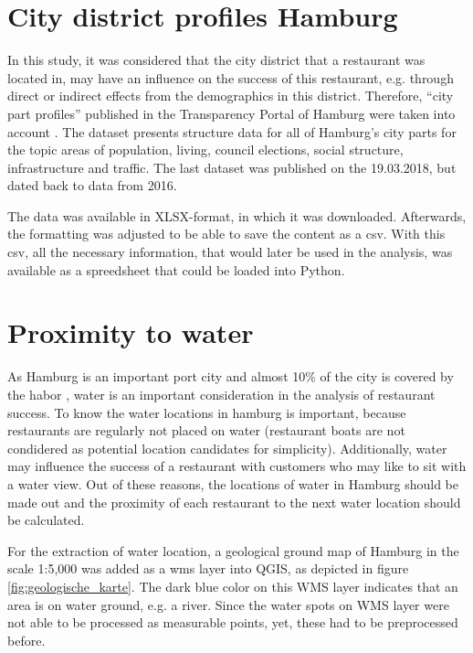 \documentclass[a4paper, 11pt, oneside]{Thesis}  %
\begin{document}
\section{City district profiles Hamburg}
\label{district_profiles}

In this study, it was considered that the city district that a restaurant was located in, may have an influence on the success of this restaurant, e.g. through direct or indirect effects from the demographics in this district. Therefore, ``city part profiles'' published in the Transparency Portal of Hamburg were taken into account \cite{Profiles2018}. The dataset presents structure data for all of Hamburg's city parts for the topic areas of population, living, council elections, social structure, infrastructure and traffic. The last dataset was published on the 19.03.2018, but dated back to data from 2016.

The data was available in XLSX-format, in which it was downloaded. Afterwards, the formatting was adjusted to be able to save the content as a \ac{csv}. With this \ac{csv}, all the necessary information, that would later be used in the analysis, was available as a spreedsheet that could be loaded into Python.

\section{Proximity to water}
\label{proximity_to_water}

As Hamburg is an important port city and almost 10\% of the city is covered by the habor \cite{HamburgStadt2019}, water is an important consideration in the analysis of restaurant success. To know the water locations in hamburg is important, because restaurants are regularly not placed on water (restaurant boats are not condidered as potential location candidates for simplicity). Additionally, water may influence the success of a restaurant with customers who may like to sit with a water view. Out of these reasons, the locations of water in Hamburg should be made out and the proximity of each restaurant to the next water location should be calculated.

For the extraction of water location, a geological ground map of Hamburg in the scale 1:5,000 \cite{GeologischeKarte2019} was added as a \ac{wms} layer into QGIS, as depicted in figure \ref{fig:geologische_karte}. The dark blue color on this WMS layer indicates that an area is on water ground, e.g. a river. Since the water spots on WMS layer were not able to be processed as measurable points, yet, these had to be preprocessed before. 
\end{document}
